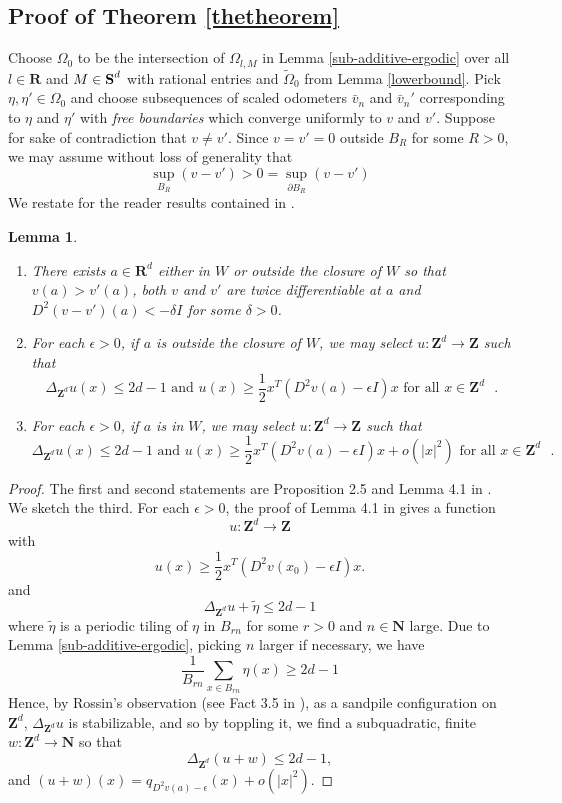 \documentclass[12pt]{amsart}
\newcommand{\R}{\mathbf{R}}
\newcommand{\Z}{\mathbf{Z}}
\newcommand{\N}{\mathbf{N}}
\newcommand{\symm}{{\mbox{\bf S}}}  %
\newtheorem{lemma}[theorem]{Lemma}
\begin{document}
\subsection{Proof of Theorem \ref{thetheorem}} \label{subsec:proof_of_theorem}
Choose $\Omega_0$  to be the intersection of $\Omega_{l,M}$ in Lemma \ref{sub-additive-ergodic} 
over all $l \in \R$ and $M \in \symm^d$ with rational entries and $\tilde{\Omega}_0$ from Lemma \ref{lowerbound}. 
Pick $\eta, \eta' \in \Omega_0$ and choose subsequences of scaled odometers $\bar{v}_n$ and $\bar{v}_n'$ corresponding to $\eta$ and $\eta'$
with {\it free boundaries} which converge uniformly to $v$ and $v'$. Suppose for sake of contradiction that $v \not = v'$. Since $v = v' = 0$ outside $B_R$ for some $R > 0$, we may assume without loss of generality that 
\[
\sup_{B_R} (v - v') >  0 = \sup_{\partial B_R} (v - v')
\]
We restate for the reader results contained in \cite{pegden2013convergence}. 
\begin{lemma} \cite{pegden2013convergence}  \label{regularity}
\begin{enumerate}
\item  There exists $a \in \R^d$ either in $W$ or outside the closure of $W$ so that $v(a) > v'(a)$, both $v$ and $v'$ are twice differentiable at $a$ and
$D^2(v - v')(a) < -\delta I$ for some $\delta > 0$.  
\item  For each $\epsilon > 0$, if $a$ is outside the closure of $W$,  we may select $u : \Z^d \to \Z$ such that 
\[
\Delta_{\Z^d} u(x) \leq 2 d -1 \mbox{ and } u(x) \geq \frac{1}{2} x^T (D^2 v(a) - \epsilon  I) x \mbox { for all $x \in \Z^d$ }. 
\]
\item For each $\epsilon > 0$, if $a$ is in $W$, we may select $u: \Z^d \to \Z$ such that
\[
\Delta_{\Z^d} u(x) \leq 2 d -1 \mbox{ and } u(x) \geq \frac{1}{2} x^T (D^2 v(a) - \epsilon  I) x + o(|x|^2) \mbox { for all $x \in \Z^d$ }. 
\]
\end{enumerate}
\end{lemma}

\begin{proof}
The first and second statements are Proposition 2.5 and Lemma 4.1 in \cite{pegden2013convergence}. We sketch the third. 
  For each $\epsilon > 0$, the proof of Lemma 4.1 in \cite{pegden2013convergence} gives a function 
\[
u : \Z^d \to \Z 
\]
with 
\[
u(x) \geq \frac{1}{2} x^T (D^2 v(x_0) - \epsilon I)  x. 
\]
and 
\[
\Delta_{\Z^d} u + \tilde{\eta} \leq 2 d -1  
\]
where $\tilde{\eta}$ is a periodic tiling of $\eta$ in $B_{ r n }$ for some $r > 0$ and $n \in \N$ large. 
Due to Lemma \ref{sub-additive-ergodic}, picking $n$ larger if necessary, we have 
\[
\frac{1}{B_{r n}} \sum_{x \in B_{r n}} \eta(x) \geq 2 d -1
\]
Hence, by Rossin's observation \cite{rossin2000proprietes} (see Fact 3.5 in \cite{levine2016apollonian}), as a sandpile configuration on $\Z^d$, $\Delta_{\Z^d} u$ is stabilizable, and so by toppling it, we find a subquadratic, finite $w: \Z^d \to \N$ so that 
\[
\Delta_{\Z^d} (u + w)  \leq 2 d -1, 
\]
and $(u + w)(x) = q_{D^2 v(a) - \epsilon}(x)+ o(|x|^2)$. 

\end{proof}
\end{document}
